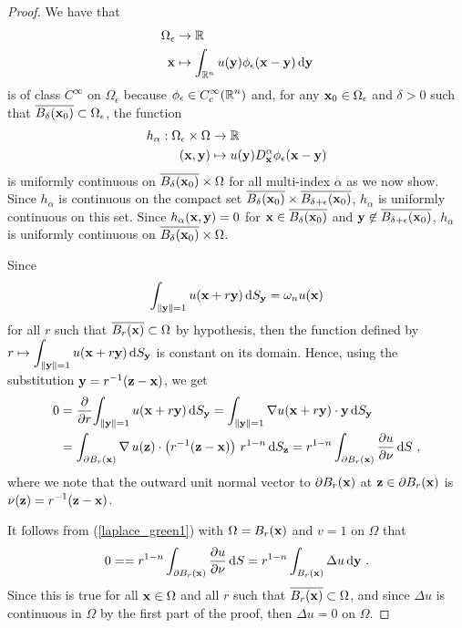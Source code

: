 \begin{proof}
We have that
\begin{align*}
\Omega_\epsilon & \rightarrow \RR \\
\VEC{x} & \mapsto
\int_{\RR^n} u(\VEC{y}) \phi_\epsilon(\VEC{x}-\VEC{y}) \dx{\VEC{y}}
\end{align*}
is of class $\displaystyle C^\infty$ on $\Omega_\epsilon$ because
$\displaystyle \phi_\epsilon \in C_c^\infty(\RR^n)$ and, for any
$\VEC{x}_0 \in \Omega_\epsilon$ and $\delta>0$ such that
$\overline{B_\delta(\VEC{x}_0)} \subset \Omega_\epsilon$, the function
\begin{align*}
h_\alpha: \Omega_\epsilon \times \Omega &\rightarrow \RR \\
(\VEC{x},\VEC{y}) &\mapsto u(\VEC{y})D^\alpha_{\VEC{x}}
\phi_\epsilon(\VEC{x}-\VEC{y})
\end{align*}
is uniformly continuous on
$\overline{B_\delta(\VEC{x}_0)} \times \Omega$ for all
multi-index $\alpha$ as we now show.  Since $h_\alpha$ is continuous
on the compact set $\displaystyle \overline{B_\delta(\VEC{x}_0)} \times
\overline{B_{\delta+\epsilon}(\VEC{x}_0)}$, $h_\alpha$ is uniformly
continuous on this set.  Since $h_\alpha(\VEC{x},\VEC{y}) = 0$ for
$\VEC{x} \in \overline{B_{\delta}(\VEC{x}_0)}$ and
$\VEC{y} \not\in \overline{B_{\delta+\epsilon}(\VEC{x}_0)}$,
$h_\alpha$ is uniformly continuous on
$\overline{B_\delta(\VEC{x}_0)} \times \Omega$.

 Since
\[
\int_{\|\VEC{y}\|=1} u(\VEC{x}+r\VEC{y}) \dss{S}{y} = \omega_n u(\VEC{x})
\]
for all $r$ such that $\overline{B_r(\VEC{x})} \subset \Omega$ by hypothesis,
then the function defined by\\
$\displaystyle r \mapsto \int_{\|\VEC{y}\|=1} u(\VEC{x}+r\VEC{y}) \dss{S}{y}$
is constant on its domain.  Hence, using the substitution
$\VEC{y} = r^{-1} (\VEC{z}-\VEC{x})$, we get
\begin{align*}
0 &= \pdfdx{ \int_{\|\VEC{y}\|=1} u(\VEC{x}+r\VEC{y}) \dss{S}{y} }{r}
= \int_{\|\VEC{y}\|=1} \nabla u(\VEC{x}+r\VEC{y}) \cdot \VEC{y}
 \dss{S}{y} \\
&= \int_{\partial B_r(\VEC{x})} \graD u(\VEC{z}) \cdot \left(
  r^{-1} (\VEC{z} - \VEC{x}) \right) \, r^{1-n} \dss{S}{z}
= r^{1-n} \int_{\partial B_r(\VEC{x})} \pdydx{u}{\VEC{\nu}} \dx{S} \ ,
\end{align*}
where we note that the outward unit normal vector to $\partial B_r(\VEC{x})$
at $\VEC{z} \in \partial B_r(\VEC{x})$ is
$\displaystyle \VEC{\nu}(\VEC{z}) = r^{-1}(\VEC{z}-\VEC{x})$.

It follows from (\ref{laplace_green1}) with $\Omega = B_r(\VEC{x})$
and $v=1$ on $\Omega$ that
\[
0 = = r^{1-n} \int_{\partial B_r(\VEC{x})} \pdydx{u}{\VEC{\nu}} \dx{S}
= r^{1-n} \int_{B_r(\VEC{x})} \Delta u \dx{\VEC{y}} \ .
\]
Since this is true for all $\VEC{x} \in \Omega$ and
all $r$ such that $\overline{B_r(\VEC{x})} \subset \Omega$, and since
$\Delta u$ is continuous in $\Omega$ by the first part of the proof, then
$\Delta u = 0$ on $\Omega$.
\end{proof}


